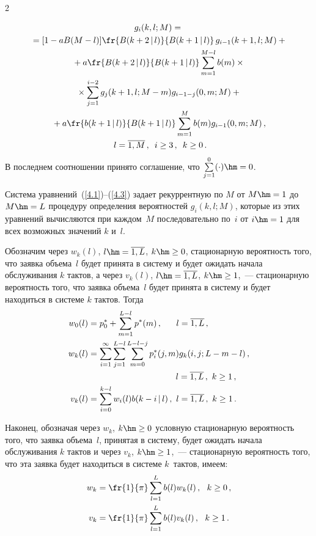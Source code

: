 \begin{multicols}{2}
\vspace*{-12pt}

\noindent
\begin{multline}
\label{4.3}
g_i(k,l;M) ={}\\
{}= [1 - a B(M-l)] \fr{B(k+2\,|\,l) }{ B(k+1\,|\,l)}
\, g_{i-1}(k+1,l;M)  +{}
\\
{}+
a \fr{B(k+2\,|\,l) }{ B(k+1\,|\,l)} \sum\limits_{m=1}^{M-l}
b(m) \times{}\\
{}\times
\sum\limits_{j=1}^{i-2} g_{j}(k+1,l;M-m)
g_{i-1-j}(0,m;M)  +{}\\
{}+
a \fr{b(k+1\,|\,l) }{ B(k+1\,|\,l)} \sum\limits_{m=1}^M
b(m) g_{i-1}(0,m;M)\,,\\
\  l= \overline{1,M}\,,\enskip  i\ge 3\,,\enskip  k\ge 0\,.
\end{multline}
В последнем соотношении принято соглашение, что
$\sum\limits_{j=1}^{0} (\cdot) \hm= 0$.

Система уравнений~(\ref{4.1})--(\ref{4.3}) задает
рекуррентную по $M$ от $M\hm=1$ до $M\hm=L$ процедуру
определения вероятностей $g_i(k,l;M)$, которые из этих уравнений
вычисляются при каждом~$M$ последовательно по~$i$ от
$i\hm=1$ для всех возможных значений $k$ и~$l$.

Обозначим через
$w_k(l)$, $l\hm= \overline{1,L}$, $k\hm\ge 0$,
стационарную вероятность того, что заявка объема~$l$
будет принята в систему и будет ожидать начала
обслуживания $k$ тактов,
а через $v_k(l)$, $l\hm= \overline{1,L}$, $k\hm\ge 1$,~---
стационарную вероятность того, что заявка объема~$l$
будет принята в систему и будет находиться в сис\-те\-ме
$k$ тактов. Тогда
\begin{align*}
w_0(l) &= p^*_0 + \sum\limits_{m=1}^{L-l} p^*(m)\,,\quad\ \ l= \overline{1,L}\,,
\\
w_k(l) &= \sum_{i=1}^{\infty} \sum\limits_{j=1}^{L-l} \sum\limits_{m=0}^{L-l-j} p^*_{i}(j,m) 
g_{k}(i,j;L-m-l)\,,\\
&\hspace*{36mm}  l= \overline{1,L}\,,\  k\ge 1\,,
\\
v_k(l) &= \sum\limits_{i=0}^{k-l} w_i(l) b(k-i\,|\,l) \,,\  l= \overline{1,L}\,,\  k\ge 1\,.
\end{align*}

Наконец, обозначая через $w_k$, $k\hm\ge 0$ условную
стационарную вероятность того, что заявка объема~$l$,
принятая в сис\-те\-му, будет ожидать начала обслуживания $k$ тактов
и через $v_k$, $k\hm\ge 1$,~--- стационарную вероятность
того, что эта заявка будет находиться в сис\-те\-ме $k$~тактов, имеем:
\begin{align*}
w_k&= \fr{1}{\pi} \sum\limits_{l=1}^{L} b(l) w_{k}(l) \,,\ \ k\ge 0\,,
\\
v_k &= \fr{1}{\pi} \sum\limits_{l=1}^{L} b(l) v_k(l) \,,\ \ k\ge 1\,.
\end{align*}


\end{multicols}
